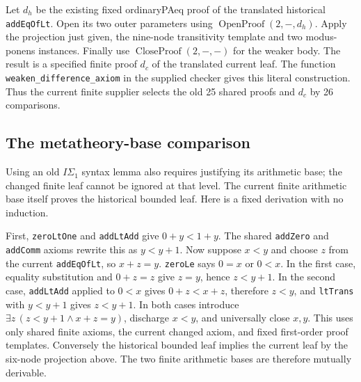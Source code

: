 Let $d_h$ be the existing fixed ordinaryPAeq proof of the translated
historical \texttt{addEqOfLt}.  Open its two outer parameters using
$\operatorname{OpenProof}(2,-,d_h)$.  Apply the projection just given,
the nine-node transitivity template and two modus-ponens instances.
Finally use $\operatorname{CloseProof}(2,-,-)$ for the weaker body.
The result is a specified finite proof $d_c$ of the translated current
leaf.  The function \texttt{weaken\_difference\_axiom} in the supplied
checker gives this literal construction.  Thus the current finite
supplier selects the old 25 shared proofs and $d_c$ by 26 comparisons.

\subsection{The metatheory-base comparison}

Using an old $I\Sigma_1$ syntax lemma also requires justifying its
arithmetic base; the changed finite leaf cannot be ignored at that level.
The current finite arithmetic base itself proves the historical bounded
leaf.  Here is a fixed derivation with no induction.

First, \texttt{zeroLtOne} and \texttt{addLtAdd} give
$0+y<1+y$.  The shared \texttt{addZero} and \texttt{addComm}
axioms rewrite this as $y<y+1$.
Now suppose $x<y$ and choose $z$ from the current
\texttt{addEqOfLt}, so $x+z=y$.
\texttt{zeroLe} says $0=x$ or $0<x$.
In the first case, equality substitution and $0+z=z$ give $z=y$,
hence $z<y+1$.  In the second case,
\texttt{addLtAdd} applied to $0<x$ gives $0+z<x+z$,
therefore $z<y$, and \texttt{ltTrans} with $y<y+1$ gives
$z<y+1$.  In both cases introduce
$\exists z\,(z<y+1\land x+z=y)$, discharge $x<y$, and
universally close $x,y$.
This uses only shared finite axioms, the current changed axiom, and
fixed first-order proof templates.  Conversely the historical bounded
leaf implies the current leaf by the six-node projection above.
The two finite arithmetic bases are therefore mutually derivable.

